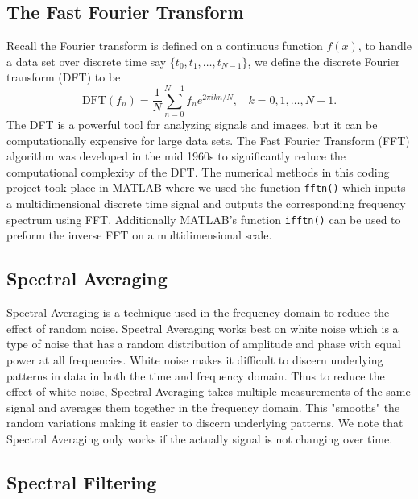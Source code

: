 \documentclass[12pt]{article}%
\numberwithin{equation}{subsection}
\begin{document}
\subsection{The Fast Fourier Transform}

Recall the Fourier transform is defined on a continuous function $f(x)$, to handle a data set over discrete time say $\{t_0, t_1, \dots, t_{N-1}\}$, we define the discrete Fourier transform (DFT) to be
\begin{equation}
    \text{DFT}(f_n) = \frac{1}{N} \sum_{n = 0}^{N-1}f_n e^{2\pi i k n / N}, ~~~~ k = 0,1,\dots,N-1.
\end{equation}
The DFT is a powerful tool for analyzing signals and images, but it can be computationally expensive for large data sets. The Fast Fourier Transform (FFT) algorithm was developed in the mid 1960s to significantly reduce the computational complexity of the DFT. The numerical methods in this coding project took place in MATLAB where we used the function \verb+fftn()+ which inputs a multidimensional discrete time signal and outputs the corresponding frequency spectrum using FFT. Additionally MATLAB's function \verb+ifftn()+ can be used to preform the inverse FFT on a multidimensional scale. 


\subsection{Spectral Averaging}

Spectral Averaging is a technique used in the frequency domain to reduce the effect of random noise. Spectral Averaging works best on white noise which is a type of noise that has a random distribution of amplitude and phase with equal power at all frequencies. White noise makes it difficult to discern underlying patterns in data in both the time and frequency domain. Thus to reduce the effect of white noise, Spectral Averaging takes multiple measurements of the same signal and averages them together in the frequency domain. This "smooths" the random variations making it easier to discern underlying patterns. We note that Spectral Averaging only works if the actually signal is not changing over time.      

\subsection{Spectral Filtering}
\end{document}
